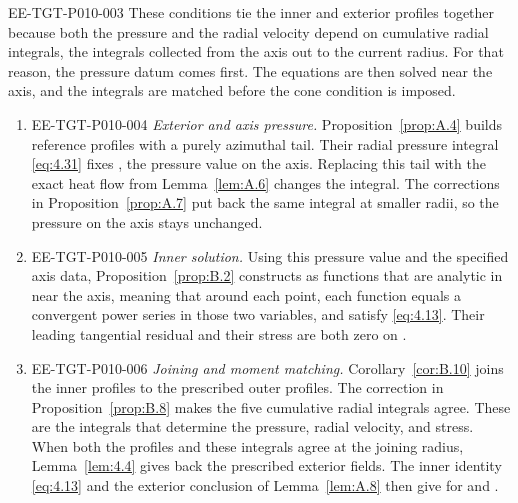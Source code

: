 \begin{EESegment}{EE-TGT-P010-003}
These conditions tie the inner and exterior profiles together because both the pressure and the
radial velocity depend on cumulative radial integrals, the integrals collected from the axis out
to the current radius. For that reason, the pressure datum comes first. The equations are then
solved near the axis, and the integrals are matched before the cone condition is imposed.
\end{EESegment}
\begin{enumerate}[label=\arabic*.]
 \item \begin{EESegment}{EE-TGT-P010-004}
 \emph{Exterior and axis pressure.} Proposition~\ref{prop:A.4} builds reference profiles with a
 purely azimuthal tail. Their radial pressure integral \eqref{eq:4.31} fixes
 , the pressure value on the axis. Replacing this tail with the
 exact heat flow from Lemma~\ref{lem:A.6} changes the integral. The corrections in
 Proposition~\ref{prop:A.7} put back the same integral at smaller radii, so the pressure on the
 axis stays unchanged.
 \end{EESegment}

 \item \begin{EESegment}{EE-TGT-P010-005}
 \emph{Inner solution.} Using this pressure value and the specified axis data,
 Proposition~\ref{prop:B.2} constructs  as functions that
 are analytic in  near the axis, meaning that around each point,
 each function equals a convergent power series in those two variables, and satisfy \eqref{eq:4.13}. Their
 leading tangential residual and their stress are both zero on
 .
 \end{EESegment}

 \item \begin{EESegment}{EE-TGT-P010-006}
 \emph{Joining and moment matching.} Corollary~\ref{cor:B.10} joins the inner profiles to the
 prescribed outer profiles. The correction in Proposition~\ref{prop:B.8} makes the five
 cumulative radial integrals agree. These are the integrals that determine the pressure, radial
 velocity, and stress. When both the profiles and these integrals agree at the joining radius,
 Lemma~\ref{lem:4.4} gives back the prescribed exterior fields. The inner identity
 \eqref{eq:4.13} and the exterior conclusion of Lemma~\ref{lem:A.8} then give
  for  and
 .
 \end{EESegment}


\end{enumerate}
